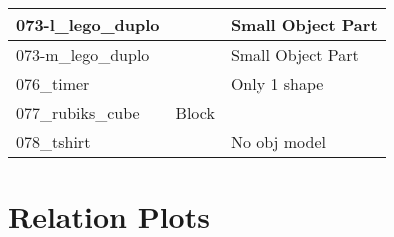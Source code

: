\documentclass{article}
\begin{document}
\begin{longtable}{|l|l|l|}
073-l\_lego\_duplo           &                & Small Object Part                     \\ \hline
073-m\_lego\_duplo           &                & Small Object Part                     \\ \hline
076\_timer                   &                & Only 1 shape                          \\ \hline
077\_rubiks\_cube            & Block          &                                       \\ \hline
078\_tshirt                  &                & No obj model                          \\ \hline
\end{longtable}

\clearpage

\section{Relation Plots}
\end{document}
